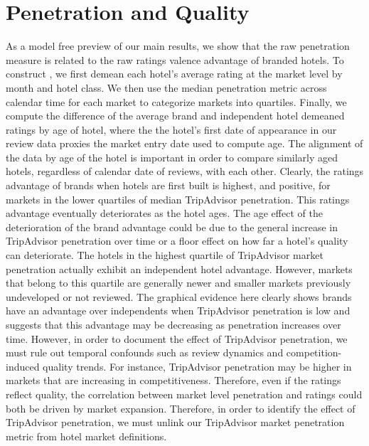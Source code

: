 \documentclass[mksc,blindrev]{informs3} %
\begin{document}

\section{Penetration and Quality}

As a model free preview of our main results, we show that the raw penetration measure is related to the raw ratings valence advantage of branded hotels. To construct , we first demean each hotel's average rating at the market level by month and hotel class. We then use the median penetration metric across calendar time for each market to categorize markets into quartiles. Finally, we compute the difference of the average brand and independent hotel demeaned ratings by age of hotel, where the the hotel's first date of appearance in our review data proxies the market entry date used to compute age. The alignment of the data by age of the hotel is important in order to compare similarly aged hotels, regardless of calendar date of reviews, with each other. Clearly, the ratings advantage of brands when hotels are first built is highest, and positive, for markets in the lower quartiles of median TripAdvisor penetration. This ratings advantage eventually deteriorates as the hotel ages. The age effect of the deterioration of the brand advantage could be due to the general increase in TripAdvisor penetration over time or a floor effect on how far a hotel's quality can deteriorate. The hotels in the highest quartile of TripAdvisor market penetration actually exhibit an independent hotel advantage. However, markets that belong to this quartile are generally newer and smaller markets previously undeveloped or not reviewed. The graphical evidence here clearly shows brands have an advantage over independents when TripAdvisor penetration is low and suggests that this advantage may be decreasing as penetration increases over time. However, in order to document the effect of TripAdvisor penetration, we must rule out temporal confounds such as review dynamics and competition-induced quality trends. For instance, TripAdvisor penetration may be higher in markets that are increasing in competitiveness. Therefore, even if the ratings reflect quality, the correlation between market level penetration and ratings could both be driven by market expansion. Therefore, in order to identify the effect of TripAdvisor penetration, we must unlink our TripAdvisor market penetration metric from hotel market definitions.
\end{document}
